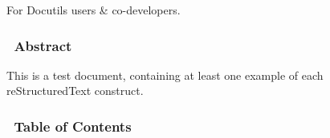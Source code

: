 \documentclass[10pt,a4paper,english]{article}
\begin{document}
For Docutils users {\&} co-developers.

\subsubsection*{~\hfill Abstract\hfill ~}

This is a test document, containing at least one example of each
reStructuredText construct.

\hypertarget{table-of-contents}{}
\subsubsection*{~\hfill Table of Contents\hfill ~}
\end{document}
